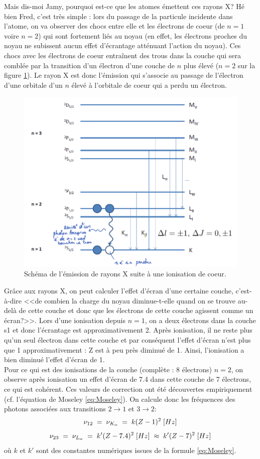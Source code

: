 Mais dis-moi Jamy, pourquoi est-ce que les atomes émettent ces rayons X? Hé bien Fred, c'est très simple : lors du passage de la particule incidente dans l'atome, on va observer des chocs entre elle et les électrons de coeur (de $n=1$ voire $n=2$) qui sont fortement liés au noyau (en effet, les électrons proches du noyau ne subissent aucun effet d'écrantage atténuant l'action du noyau). Ces chocs avec les électrons de coeur entraînent des trous dans la couche qui sera comblée par la transition d'un électron d'une couche de $n$ plus élevé ($n=2$ sur la figure \ref{fig:Rayons X}). Le rayon X est donc l'émission qui s'associe au passage de l'électron d'une orbitale d'un $n$ élevé à l'orbitale de coeur qui a perdu un électron.
\begin{figure}[htp]
    \centering
    \includegraphics[scale=0.8]{Images2/Rayons X.PNG}
    \caption{Schéma de l'émission de rayons X suite à une ionisation de coeur.}
    \label{fig:Rayons X}
\end{figure}
Grâce aux rayons X, on peut calculer l'effet d'écran d'une certaine couche, c'est-à-dire <<de combien la charge du noyau diminue-t-elle quand on se trouve au-delà de cette couche et donc que les électrons de cette couche agissent comme un écran?>>. Lors d'une ionisation depuis $n=1$, on a deux électrons dans la couche s1 et donc l'écrantage est approximativement 2. Après ionisation, il ne reste plus qu'un seul électron dans cette couche et par conséquent l'effet d'écran n'est plus que 1 approximativement : Z est à peu près diminué de 1. Ainsi, l'ionisation a bien diminué l'effet d'écran de 1.\\
Pour ce qui est des ionisations de la couche (complète : 8 électrons) $n=2$, on observe après ionisation un effet d'écran de 7.4 dans cette couche de 7 électrons, ce qui est cohérent. Ces valeurs de correction ont été découvertes empiriquement (cf. l'équation de Moseley \ref{eq:Moseley}).
On calcule donc les fréquences des photons associées aux transitions $2\rightarrow1$ et $3\rightarrow2$:
\[
    \nu_{12}
    \; = \; \nu_{K_\alpha}
    \; = \; k (Z - 1)^2 \;[Hz]
\]
\[
    \nu_{23}
    \; = \; \nu_{L_\alpha}
    \; = \; k' (Z - 7.4)^2 \;[Hz]
    \;\approx\;  k' (Z - 7)^2 \;[Hz]
\]
où $k$ et $k'$ sont des constantes numériques issues de la formule \ref{eq:Moseley}.



